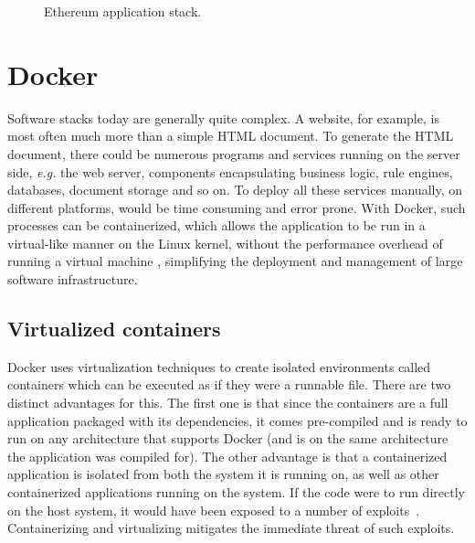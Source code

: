 
\begin{figure}[ht]
\centering
{}
\caption{Ethereum application stack.}
\label{fig:tech:stack}
\end{figure}

\section{Docker}
Software stacks today are generally quite complex. A website, for example, is most often much more than a simple HTML document. To generate the HTML document, there could be numerous programs and services running on the server side, \textit{e.g.} the web server, components encapsulating business logic, rule engines, databases, document storage and so on. To deploy all these services manually, on different platforms, would be time consuming and error prone. With Docker, such processes can be containerized, which allows the application to be run in a virtual-like manner on the Linux kernel, without the performance overhead of running a virtual machine \cite{docker-about}, simplifying the deployment and management of large software infrastructure.

\subsection{Virtualized containers}
Docker uses virtualization techniques to create isolated environments called containers which can be executed as if they were a runnable file. There are two distinct advantages for this. The first one is that since the containers are a full application packaged with its dependencies, it comes pre-compiled and is ready to run on any architecture that supports Docker (and is on the same architecture the application was compiled for). The other advantage is that a containerized application is isolated from both the system it is running on, as well as other containerized applications running on the system. If the code were to run directly on the host system, it would have been exposed to a number of exploits~\cite{korpela:2012}. Containerizing and virtualizing mitigates the immediate threat of such exploits.

